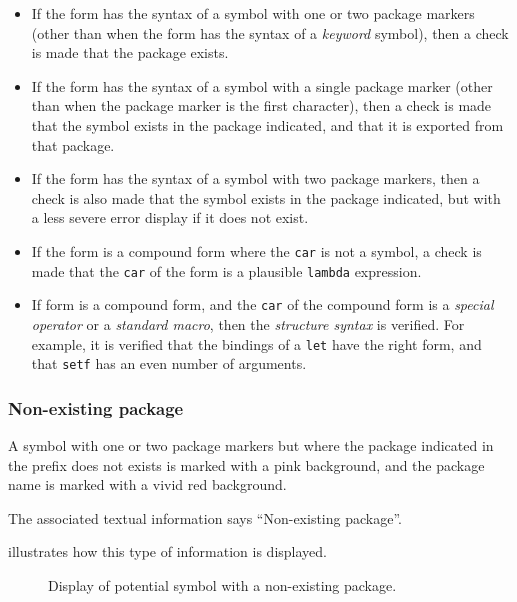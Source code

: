 \begin{itemize}
\item If the form has the syntax of a symbol with one or two package
  markers (other than when the form has the syntax of a \emph{keyword}
  symbol), then a check is made that the package exists. 
\item If the form has the syntax of a symbol with a single package
  marker (other than when the package marker is the first character),
  then a check is made that the symbol exists in the package
  indicated, and that it is exported from that package.
\item If the form has the syntax of a symbol with two package markers,
  then a check is also made that the symbol exists in the package
  indicated, but with a less severe error display if it does not
  exist.
\item If the form is a compound form where the \texttt{car} is not a
  symbol, a check is made that the \texttt{car} of the form is a
  plausible \texttt{lambda} expression.
\item If form is a compound form, and the \texttt{car} of the compound
  form is a \emph{special operator} or a \emph{standard macro}, then
  the \emph{structure syntax} is verified.  For example, it is
  verified that the bindings of a \texttt{let} have the right form,
  and that \texttt{setf} has an even number of arguments. 
\end{itemize}

\subsubsection{Non-existing package}

A symbol with one or two package markers but where the package
indicated in the prefix does not exists is marked with a pink
background, and the package name is marked with a vivid red
background. 

The associated textual information says ``Non-existing package''.

 illustrates how this type of
information is displayed.

\begin{figure}
\begin{center}
\end{center}
\caption{\label{fig-non-existing-package}
Display of potential symbol with a non-existing package.}
\end{figure}

